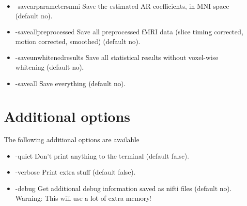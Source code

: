 \begin{itemize}
\item -savearparametersmni       
\newline \newline Save the estimated AR coefficients, in MNI space (default no). 

\item -saveallpreprocessed       
\newline \newline Save all preprocessed fMRI data  \newline (slice timing corrected, motion corrected, smoothed) (default no). 

\newpage

\item -saveunwhitenedresults     
\newline \newline Save all statistical results without voxel-wise whitening (default no). 

\item -saveall                   
\newline \newline Save everything (default no). 


\end{itemize}

\section{Additional options}

The following additional options are available

\begin{itemize}

\item -quiet
\newline \newline Don't print anything to the terminal (default false). 

\item -verbose
\newline \newline Print extra stuff (default false).

\item -debug
\newline \newline Get additional debug information saved as nifti files (default no). Warning: This will use a lot of extra memory! 

\end{itemize}

